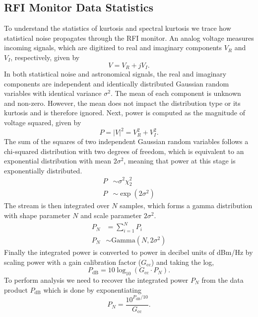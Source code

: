 \subsection{RFI Monitor Data Statistics}
\label{sec:rfi_monitor_data_statistics}
To understand the statistics of kurtosis and spectral kurtosis we trace how statistical noise propagates through the RFI monitor. 
An analog voltage measures incoming signals, which are digitized to real and imaginary components $V_R$ and $V_I$, respectively, given by
\begin{equation}
    V = V_R + jV_I.
\end{equation}
In both statistical noise and astronomical signals, the real and imaginary components are independent and identically distributed Gaussian random variables with identical variance $\sigma^2$. The mean of each component is unknown and non-zero. However, the mean does not impact the distribution type or its kurtosis and is therefore ignored. Next, power is computed as the magnitude of voltage squared, given by
\begin{equation}
    P = |V|^2 = V_R^2 + V_I^2.
\end{equation}
The sum of the squares of two independent Gaussian random variables follows a chi-squared distribution with two degrees of freedom, which is equivalent to an exponential distribution with mean $2\sigma^2$, meaning that power at this stage is exponentially distributed.
\begin{align}
    P &\sim \sigma^2 \chi^2_2  \\[4pt]
    P &\sim \exp (2\sigma^2)
\end{align}
The stream is then integrated over $N$ samples, which forms a gamma distribution with shape parameter $N$ and scale parameter $2\sigma^2$.
\begin{align}
    P_N &= \sum_{i=1}^{N} P_i \\[4pt]
    P_N &\sim \text{Gamma}(N, 2\sigma^2)
\end{align}
Finally the integrated power is converted to power in decibel units of dBm/Hz by scaling power with a gain calibration factor ($G_\mathrm{cc}$) and taking the log,
\begin{equation}
    P_\mathrm{dB} = 10\log_{10}(G_\mathrm{cc} \cdot P_N).
\end{equation}
To perform analysis we need to recover the integrated power \mbox{$P_N$} from the data product \mbox{$P_\mathrm{dB}$} which is done by exponentiating
\begin{equation}
    P_N = \frac{10^{P_\mathrm{dB}/10}}{G_\mathrm{cc}}.
\end{equation}

